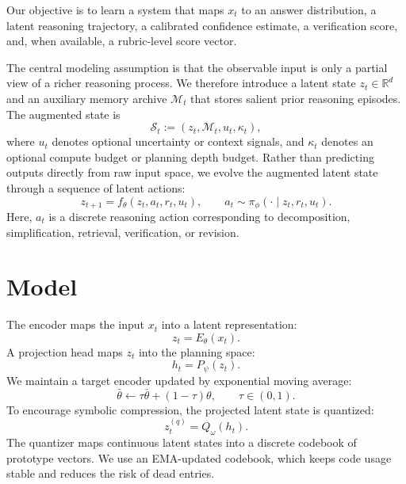 \documentclass[11pt]{article}
\newcommand{\R}{\mathbb{R}}
\newcommand{\1}{\mathbbm{1}}
\begin{document}
Our objective is to learn a system that maps $x_t$ to an answer distribution, a latent reasoning trajectory, a calibrated confidence estimate, a verification score, and, when available, a rubric-level score vector.

The central modeling assumption is that the observable input is only a partial view of a richer reasoning process. We therefore introduce a latent state $z_t \in \R^d$ and an auxiliary memory archive $\mathcal{M}_t$ that stores salient prior reasoning episodes. The augmented state is
\begin{equation}
\mathcal{S}_t := (z_t,\mathcal{M}_t,u_t,\kappa_t),
\end{equation}
where $u_t$ denotes optional uncertainty or context signals, and $\kappa_t$ denotes an optional compute budget or planning depth budget. Rather than predicting outputs directly from raw input space, we evolve the augmented latent state through a sequence of latent actions:
\begin{equation}
z_{t+1} = f_\theta(z_t, a_t, r_t, u_t), 
\qquad
a_t \sim \pi_\phi(\cdot \mid z_t, r_t, u_t).
\end{equation}
Here, $a_t$ is a discrete reasoning action corresponding to decomposition, simplification, retrieval, verification, or revision.

\section{Model}
The encoder maps the input $x_t$ into a latent representation:
\begin{equation}
z_t = E_\theta(x_t).
\end{equation}
A projection head maps $z_t$ into the planning space:
\begin{equation}
h_t = P_\psi(z_t).
\end{equation}
We maintain a target encoder updated by exponential moving average:
\begin{equation}
\bar{\theta} \leftarrow \tau \bar{\theta} + (1-\tau)\theta, 
\qquad \tau \in (0,1).
\end{equation}
To encourage symbolic compression, the projected latent state is quantized:
\begin{equation}
z_t^{(q)} = Q_\omega(h_t).
\end{equation}
The quantizer maps continuous latent states into a discrete codebook of prototype vectors. We use an EMA-updated codebook, which keeps code usage stable and reduces the risk of dead entries.
\end{document}
